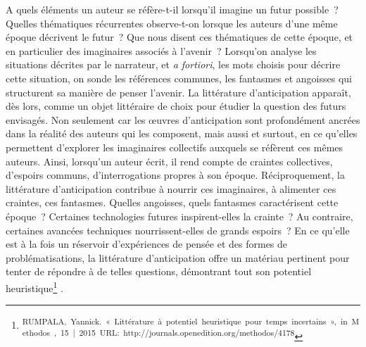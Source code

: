 \documentclass[letterpaper,portrait,12pt]{article}
\begin{document}
\textbf{\textcolor[rgb]{0.000,0.000,0.000}{	}}\textcolor[rgb]{0.000,0.000,0.000}{A quels \'{e}l\'{e}ments un auteur se r\'{e}f\`{e}re-t-il lorsqu'il imagine un futur possible ? Quelles th\'{e}matiques r\'{e}currentes observe-t-on lorsque les auteurs d'une m\^{e}me \'{e}poque d\'{e}crivent le futur ? Que nous disent ces th\'{e}matiques de cette \'{e}poque, et en particulier des imaginaires associ\'{e}s \`{a} l'avenir ? Lorsqu'on analyse les situations d\'{e}crites par le narrateur, et }\emph{\textcolor[rgb]{0.000,0.000,0.000}{a fortiori}}\textcolor[rgb]{0.000,0.000,0.000}{, les mots choisis pour d\'{e}crire cette situation, on sonde les r\'{e}f\'{e}rences communes, les fantasmes et angoisses qui structurent sa mani\`{e}re de penser l'avenir. La litt\'{e}rature d'anticipation appara\^{i}t, d\`{e}s lors, comme un objet litt\'{e}raire de choix pour \'{e}tudier la question des futurs envisag\'{e}s. Non seulement car les \oe{}uvres d'anticipation sont profond\'{e}ment ancr\'{e}es dans la r\'{e}alit\'{e} des auteurs qui les composent, mais aussi et surtout, en ce qu'elles permettent d'explorer les imaginaires collectifs auxquels se r\'{e}f\`{e}rent ces m\^{e}mes auteurs. Ainsi, lorsqu'un auteur \'{e}crit, il rend compte de craintes collectives, d'espoirs communs, d'interrogations propres \`{a} son \'{e}poque. R\'{e}ciproquement, la litt\'{e}rature d'anticipation contribue \`{a} nourrir ces imaginaires, \`{a} alimenter ces craintes, ces fantasmes}\textcolor[rgb]{0.000,0.000,0.000}{.}\emph{\textcolor[rgb]{0.000,0.000,0.000}{ }}\textcolor[rgb]{0.000,0.000,0.000}{Quelles angoisses, quels fantasmes caract\'{e}risent cette \'{e}poque ? Certaines technologies futures inspirent-elles la crainte ? Au contraire, certaines avanc\'{e}es techniques nourrissent-elles de grands espoirs ? En ce qu'elle est \`{a} la fois un r\'{e}servoir d'exp\'{e}riences de pens\'{e}e et des formes de probl\'{e}matisations, la litt\'{e}rature d'anticipation offre un mat\'{e}riau pertinent pour tenter de r\'{e}pondre \`{a} de telles questions, d\'{e}montrant tout son potentiel heuristique}\footnote{\textsuperscript{\textcolor[rgb]{0.000,0.000,0.000}{\newpage
}}\textsuperscript{\textcolor[rgb]{0.000,0.000,0.000}{	RUMPALA,\ Yannick.\ «\ Litt\'{e}rature\ \`{a}\ potentiel\ heuristique\ pour\ temps\ incertains\ »,\ in\ Methodos\ ,\ 15\ |\ 2015\ URL:\ http://journals.openedition.org/methodos/4178}}} \textcolor[rgb]{0.000,0.000,0.000}{. }
\end{document}
